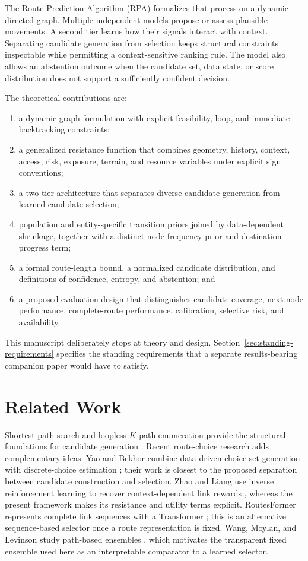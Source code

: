 \documentclass[11pt,letterpaper]{article}
\begin{document}
The Route Prediction Algorithm (RPA) formalizes that process on a dynamic directed graph. Multiple independent models propose or assess plausible movements. A second tier learns how their signals interact with context. Separating candidate generation from selection keeps structural constraints inspectable while permitting a context-sensitive ranking rule. The model also allows an abstention outcome when the candidate set, data state, or score distribution does not support a sufficiently confident decision.

The theoretical contributions are:

\begin{enumerate}
  \item a dynamic-graph formulation with explicit feasibility, loop, and immediate-backtracking constraints;
  \item a generalized resistance function that combines geometry, history, context, access, risk, exposure, terrain, and resource variables under explicit sign conventions;
  \item a two-tier architecture that separates diverse candidate generation from learned candidate selection;
  \item population and entity-specific transition priors joined by data-dependent shrinkage, together with a distinct node-frequency prior and destination-progress term;
  \item a formal route-length bound, a normalized candidate distribution, and definitions of confidence, entropy, and abstention; and
  \item a proposed evaluation design that distinguishes candidate coverage, next-node performance, complete-route performance, calibration, selective risk, and availability.
\end{enumerate}

This manuscript deliberately stops at theory and design. Section~\ref{sec:standing-requirements} specifies the standing requirements that a separate results-bearing companion paper would have to satisfy.

\section{Related Work}

Shortest-path search and loopless $K$-path enumeration provide the structural foundations for candidate generation \cite{dijkstra1959,yen1971}. Recent route-choice research adds complementary ideas. Yao and Bekhor combine data-driven choice-set generation with discrete-choice estimation \cite{yao2020}; their work is closest to the proposed separation between candidate construction and selection. Zhao and Liang use inverse reinforcement learning to recover context-dependent link rewards \cite{zhao2023}, whereas the present framework makes its resistance and utility terms explicit. RoutesFormer represents complete link sequences with a Transformer \cite{qiu2024}; this is an alternative sequence-based selector once a route representation is fixed. Wang, Moylan, and Levinson study path-based ensembles \cite{wang2024}, which motivates the transparent fixed ensemble used here as an interpretable comparator to a learned selector.
\end{document}
